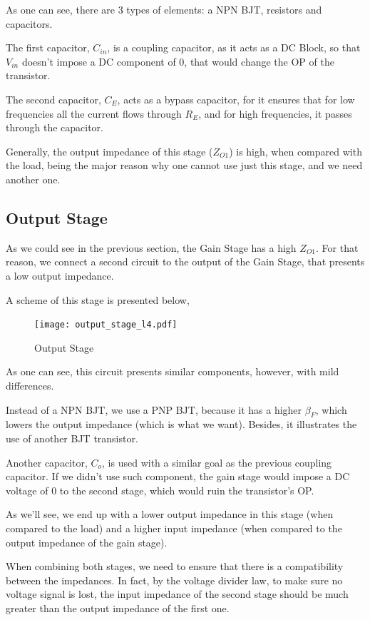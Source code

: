As one can see, there are 3 types of elements: a NPN BJT, resistors and capacitors.

The first capacitor, $C_{in}$, is a coupling capacitor, as it acts as a DC Block, so that $V_{in}$ doesn't impose a DC component of 0, that would change the OP of the transistor.

The second capacitor, $C_E$, acts as a bypass capacitor, for it ensures that for low frequencies all the current flows through $R_E$, and for high frequencies, it passes through the capacitor.

Generally, the output impedance of this stage ($Z_{O1}$) is high, when compared with the load, being the major reason why one cannot use just this stage, and we need another one.

\subsection{Output Stage}

As we could see in the previous section, the Gain Stage has a high $Z_{O1}$. For that reason, we connect a second circuit to the output of the Gain Stage, that presents a low output impedance.

A scheme of this stage is presented below, 

\begin{figure}[h]
    \centering
    \texttt{[image: output\_stage\_l4.pdf]}
    \caption{Output Stage}
    \label{fig:regulator}
\end{figure}

As one can see, this circuit presents similar components, however, with mild differences.

Instead of a NPN BJT, we use a PNP BJT, because it has a higher $\beta_F$, which lowers the output impedance (which is what we want). Besides, it illustrates the use of another BJT transistor.

Another capacitor, $C_o$, is used with a similar goal as the previous coupling capacitor. If we didn't use such component, the gain stage would impose a DC voltage of 0 to the second stage, which would ruin the transistor's OP. 

As we'll see, we end up with a lower output impedance in this stage (when compared to the load) and a higher input impedance (when compared to the output impedance of the gain stage).

When combining both stages, we need to ensure that there is a compatibility  between the impedances. In fact, by the voltage divider law, to make sure no voltage signal is lost, the input impedance of the second stage should be much greater than the output impedance of the first one. 

